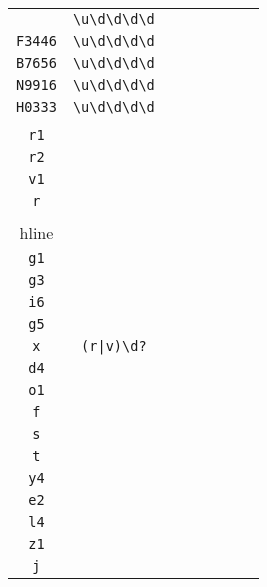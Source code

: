 \begin{longtable}{cccccccc}
\begin{tabular}{ll}
    \verb|F4119| & \verb|\u\d\d\d\d|\\
\verb|F3446| & \verb|\u\d\d\d\d|\\
\verb|B7656| & \verb|\u\d\d\d\d|\\
\verb|N9916| & \verb|\u\d\d\d\d|\\
\verb|H0333| & \verb|\u\d\d\d\d|
\end{tabular}
\\\midrule 
\begin{tabular}{l}
    \verb|r6|\\
\verb|r1|\\
\verb|r2|\\
\verb|v1|\\
\verb|r|\\
\\hline\\
\verb|g1|\\
\verb|g3|\\
\verb|i6|\\
\verb|g5|\\
\verb|x|
\end{tabular}

&
\verb.(r|v)\d?.
&

\begin{tabular}{l}
    \verb|\l(\d)*|\\
\verb|d4|\\
\verb|o1|\\
\verb|f|\\
\verb|s|\\
\verb|t|
\end{tabular}

&

\begin{tabular}{l}
    \verb.\l(\d)|.\\
\verb|y4|\\
\verb|e2|\\
\verb|l4|\\
\verb|z1|\\
\verb|j|
\end{tabular}

&


\end{longtable}
